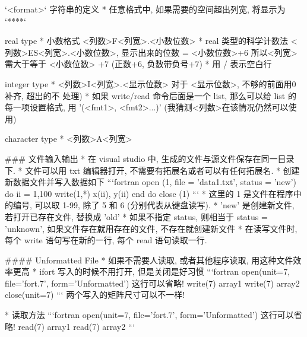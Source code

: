 `<format>` 字符串的定义
* 任意格式中, 如果需要的空间超出列宽, 将显示为 `****`

real type
* 小数格式 <列数>F<列宽>.<小数位数>
* real 类型的科学计数法  <列数>ES<列宽>.<小数位数>, 显示出来的位数 = <小数位数>+6
  所以<列宽> 需大于等于 <小数位数> +7 (正数+6, 负数带负号+7)
* 用 / 表示空白行

integer type
* <列数>I<列宽>.<显示位数>  对于 <显示位数>, 不够的前面用0补齐, 超出的不
   处理)
* 如果 write/read 命令后面是一个 list, 那么可以给 list 的每一项设置格式, 用 '(<fmt1>, <fmt2>...)'  (我猜测<列数>在该情况仍然可以使用)

character type
* <列数>A<列宽>

### 文件输入输出
* 在 visual studio 中, 生成的文件与源文件保存在同一目录下.
* 文件可以用 txt 编辑器打开, 不需要有拓展名或者可以有任何拓展名.
* 创建新数据文件并写入数据如下
```fortran
open (1, file = 'data1.txt', status = 'new')
do ii = 1,100
	write(1,*) x(ii), y(ii)
end do
close (1)
```
* 这里的 1 是文件在程序中的编号, 可以取 1-99, 除了 5 和 6 (分别代表从键盘读写).
* 'new' 是创建新文件, 若打开已存在文件, 替换成 'old'
* 如果不指定 status, 则相当于 status = 'unknown', 如果文件存在就用存在的文件, 不存在就创建新文件
* 在读写文件时, 每个 write 语句写在新的一行, 每个 read 语句读取一行.

#### Unformatted File
* 如果不需要人读取, 或者其他程序读取, 用这种文件效率更高
* ifort 写入的时候不用打开, 但是关闭是好习惯
```fortran
open(unit=7, file='fort.7', form='Unformatted') 这行可以省略!
write(7) array1
write(7) array2
close(unit=7)
```
两个写入的矩阵尺寸可以不一样!

* 读取方法
```fortran
open(unit=7, file='fort.7', form='Unformatted') 这行可以省略!
read(7) array1
read(7) array2
```

